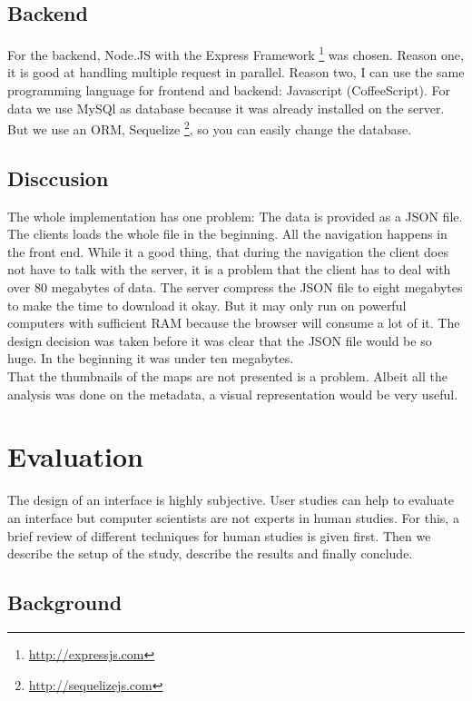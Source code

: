 \documentclass[11pt]{report}
\begin{document}
{{\section{Backend}

For the backend, Node.JS with the Express Framework \footnote{\url{http://expressjs.com}} was chosen. Reason one, it is good at handling multiple request in parallel. Reason two, I can use the same programming language for frontend and backend: Javascript (CoffeeScript). For data we use MySQl as database because it was already installed on the server. But we use an ORM, Sequelize \footnote{\url{http://sequelizejs.com}},  so you can easily change the database.

\section{Disccusion}

The whole implementation has one problem: The data is provided as a JSON file. The clients loads the whole file in the beginning. All the navigation happens in the front end. While it a good thing, that during the navigation the client does not have to talk with the server, it is a problem that the client has to deal with over 80 megabytes of data. The server compress the JSON file to eight megabytes to make the time to download it okay. But it may only run on powerful computers with sufficient RAM because the browser will consume a lot of it. The design decision was taken before it was clear that the JSON file would be so huge. In the beginning it was under ten megabytes. \\

That the thumbnails of the maps are not presented is a problem. Albeit all the analysis was done on the metadata, a visual representation would be very useful.

\chapter{Evaluation}
\label{Evaluation}

The design of an interface is highly subjective. User studies can help to evaluate an interface but computer scientists are not experts in human studies. For this, a brief review of different techniques for human studies is given first. Then we describe the setup of the study, describe the results and finally conclude. \\

\section{Background}

}}
\end{document}
